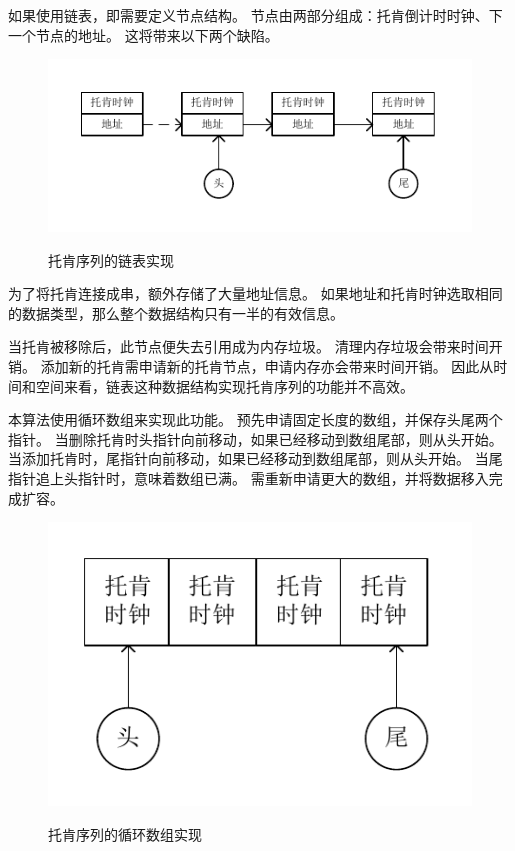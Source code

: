 如果使用链表，即需要定义节点结构。
节点由两部分组成：托肯倒计时时钟、下一个节点的地址。
这将带来以下两个缺陷。

\begin{figure}[H]
	\centering
	\includegraphics[scale=1.00,angle=0]{figures/托肯序列_链表.pdf}\\
	\caption{托肯序列的链表实现}
\end{figure}

为了将托肯连接成串，额外存储了大量地址信息。
如果地址和托肯时钟选取相同的数据类型，那么整个数据结构只有一半的有效信息。

当托肯被移除后，此节点便失去引用成为内存垃圾。
清理内存垃圾会带来时间开销。
添加新的托肯需申请新的托肯节点，申请内存亦会带来时间开销。
因此从时间和空间来看，链表这种数据结构实现托肯序列的功能并不高效。

本算法使用循环数组来实现此功能。
预先申请固定长度的数组，并保存头尾两个指针。
当删除托肯时头指针向前移动，如果已经移动到数组尾部，则从头开始。
当添加托肯时，尾指针向前移动，如果已经移动到数组尾部，则从头开始。
当尾指针追上头指针时，意味着数组已满。
需重新申请更大的数组，并将数据移入完成扩容。

\begin{figure}[H]
	\centering
	\includegraphics[scale=1.00,angle=0]{figures/托肯序列_循环数组.pdf}\\
	\caption{托肯序列的循环数组实现}
\end{figure}

